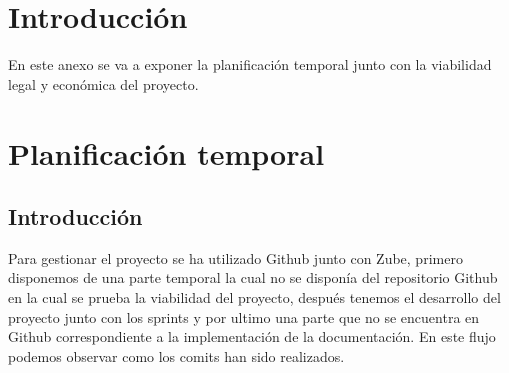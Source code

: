 
\section{Introducción}

En este anexo se va a exponer la planificación temporal junto con la viabilidad legal y económica del proyecto.

\section{Planificación temporal}

\subsection{Introducción}
Para gestionar el proyecto se ha utilizado Github junto con Zube, primero disponemos de una parte temporal la cual no se disponía del repositorio Github en la cual se prueba la viabilidad del proyecto, después tenemos el desarrollo del proyecto junto con los sprints y por ultimo una parte que no se encuentra en Github correspondiente a la implementación de la documentación. En este flujo podemos observar como los comits han sido realizados.
